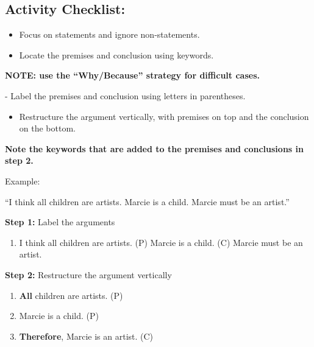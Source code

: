 \documentclass[
]{book}
\providecommand{\tightlist}{%
  \setlength{\itemsep}{0pt}\setlength{\parskip}{0pt}}
\begin{document}
\hypertarget{activity-checklist-2}{%
\subsection*{Activity Checklist:}\label{activity-checklist-2}}

\begin{itemize}
\item
  Focus on statements and ignore non-statements.
\item
  Locate the premises and conclusion using keywords.
\end{itemize}

\begin{progress}
\textbf{NOTE: use the ``Why/Because'' strategy for difficult cases.}
\end{progress}
- Label the premises and conclusion using letters in parentheses.

\begin{itemize}
\tightlist
\item
  Restructure the argument vertically, with premises on top and the conclusion on the bottom.
\end{itemize}

\begin{progress}
\textbf{Note the keywords that are added to the premises and conclusions in step 2.}
\end{progress}

Example:

``I think all children are artists. Marcie is a child. Marcie must be an artist.''

\textbf{Step 1:} Label the arguments

\begin{enumerate}
\def\labelenumi{(\Alph{enumi})}
\setcounter{enumi}{15}
\tightlist
\item
  I think all children are artists. (P) Marcie is a child. (C) Marcie must be an artist.
\end{enumerate}

\textbf{Step 2:} Restructure the argument vertically

\begin{enumerate}
\def\labelenumi{\arabic{enumi}.}
\tightlist
\item
  \textbf{All} children are artists. (P)
\item
  Marcie is a child. (P)
\item
  \textbf{Therefore}, Marcie is an artist. (C)
\end{enumerate}
\end{document}
